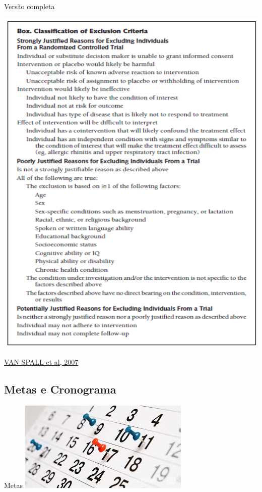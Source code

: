 \documentclass{beamer}
\begin{document}
\begin{frame}{Versão completa}
  \begin{center}
    \includegraphics[height=.9\textheight]{Planejamento/box-crit-exclusao}
  \end{center}

  \vfill
  \scriptsize
  \hfill \href{https://doi.org/10.1001/jama.297.11.1233}{VAN SPALL et al, 2007}
\end{frame}

\subsection{Metas e Cronograma}

\begin{frame}{Metas}
  \includegraphics[width=\textwidth]{Planejamento/metas}
\end{frame}
\end{document}
